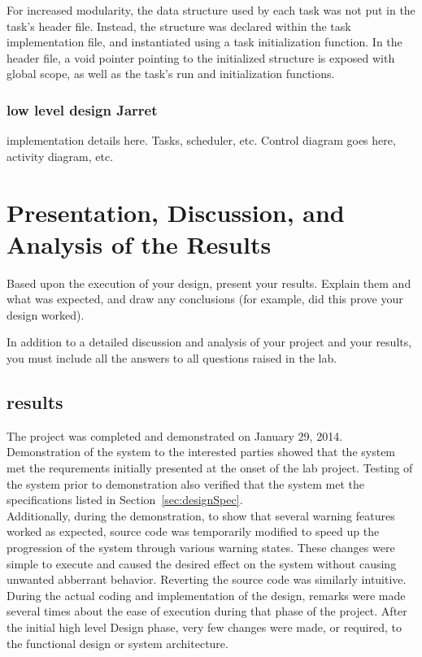 \documentclass[12pt]{article} %
\begin{document}
For increased modularity, the data structure used by each task was not put in
the task's header file.  Instead, the structure was declared within the task
implementation file, and instantiated using a task initialization function.  In
the header file, a void pointer pointing to the initialized structure is
exposed with global scope, as well as the task's run and initialization functions.

\subsubsection{low level design  Jarret}

implementation details here. Tasks, scheduler, etc. Control diagram goes here, activity diagram, etc.

\section{Presentation, Discussion, and Analysis of the Results}

Based upon the execution of your design, present your results. Explain them and what was expected, and draw any conclusions (for example, did this prove your design worked).

In addition to a detailed discussion and analysis of your project and your results, you must include all the answers to all questions raised in the lab.
\subsection{results}
The project was completed and demonstrated on January 29, 2014. \\

Demonstration of the system to the interested parties showed that the system met the requrements initially presented at the onset of the lab project.
Testing of the system prior to demonstration also verified that the system met the specifications listed in Section~\ref{sec:designSpec}. \\
Additionally, during the demonstration, to show that several warning features worked as expected, source code was temporarily modified to speed up the progression of the system through various warning states. These changes were simple to execute and caused the desired effect on the system without causing unwanted abberrant behavior. Reverting the source code was similarly intuitive.
During the actual coding and implementation of the design, remarks were made several times about the ease of execution during that phase of the project. After the initial high level Design phase, very few changes were made, or required, to the functional design or system architecture.\\
\end{document}
